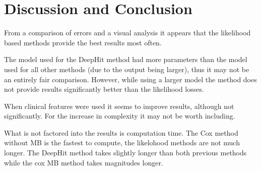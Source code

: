 
\section{Discussion and Conclusion} \label{sec:discussion}
    From a comparison of errors and a visual analysis it appears that the likelihood based methods provide the best results most often.
    
    The model used for the DeepHit method had more parameters than the model used for all other methods (due to the output being larger), thus it may not be an entirely fair comparison. However, while using a larger model the method does not provide results significantly better than the likelihood losses.
    
    When clinical features were used it seems to improve results, although not significantly. For the increase in complexity it may not be worth including.
    
    What is not factored into the results is computation time. The Cox method without \gls{MB} is the fastest to compute, the likelohood methods are not much longer. The DeepHit method takes slightly longer than both previous methods while the cox \gls{MB} method takes magnitudes longer.

